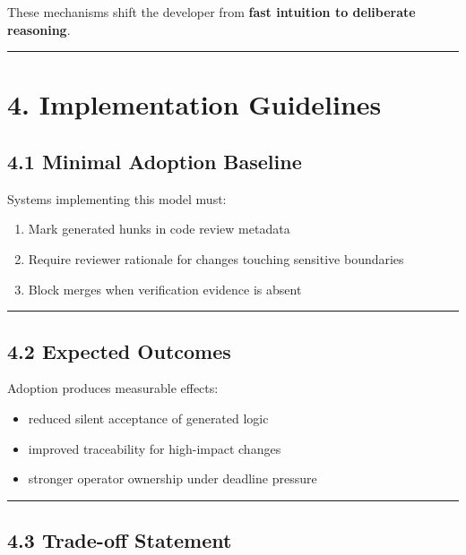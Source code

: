 \documentclass[
]{article}
\providecommand{\tightlist}{%
  \setlength{\itemsep}{0pt}\setlength{\parskip}{0pt}}
\begin{document}
These mechanisms shift the developer from \textbf{fast intuition to
deliberate reasoning}.

\begin{center}\rule{0.5\linewidth}{0.5pt}\end{center}

\section{4. Implementation
Guidelines}\label{4-implementation-guidelines}

\subsection{4.1 Minimal Adoption
Baseline}\label{41-minimal-adoption-baseline}

Systems implementing this model must:

\begin{enumerate}
\def\labelenumi{\arabic{enumi}.}
\tightlist
\item
  Mark generated hunks in code review metadata
\item
  Require reviewer rationale for changes touching sensitive boundaries
\item
  Block merges when verification evidence is absent
\end{enumerate}

\begin{center}\rule{0.5\linewidth}{0.5pt}\end{center}

\subsection{4.2 Expected Outcomes}\label{42-expected-outcomes}

Adoption produces measurable effects:

\begin{itemize}
\tightlist
\item
  reduced silent acceptance of generated logic
\item
  improved traceability for high-impact changes
\item
  stronger operator ownership under deadline pressure
\end{itemize}

\begin{center}\rule{0.5\linewidth}{0.5pt}\end{center}

\subsection{4.3 Trade-off Statement}\label{43-trade-off-statement}
\end{document}
